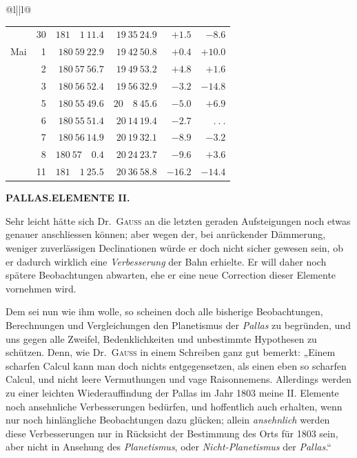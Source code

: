 \begin{center}
{\begin{tabular}{@{}l||l@{}}
\begin{tabular}[t]{@{}r@{\enspace}r|r|r|r|r@{}}
&30&$181\quad1\ 11.4$&$19\ 35\ 24.9$&$+1.5$&$-8.6$\\
Mai&1&$180\ 59\ 22.9$&$19\ 42\ 50.8$&$+0.4$&$+10.0$\\
&2&$180\ 57\ 56.7$&$19\ 49\ 53.2$&$+4.8$&$+1.6$\\
&3&$180\ 56\ 52.4$&$19\ 56\ 32.9$&$-3.2$&$-14.8$\\
&5&$180\ 55\ 49.6$&$20\quad8\ 45.6$&$-5.0$&$+6.9$\\
&6&$180\ 55\ 51.4$&$20\ 14\ 19.4$&$-2.7$&$\ .\ .\ .$\\
&7&$180\ 56\ 14.9$&$20\ 19\ 32.1$&$-8.9$&$-3.2$\\
&8&$180\ 57\quad0.4$&$20\ 24\ 23.7$&$-9.6$&$+3.6$\\
&11&$181\quad1\ 25.5$&$20\ 36\ 58.8$&$-16.2$&$-14.4$
\end{tabular}
\end{tabular}%
}%
\ifdim\wd0>\linewidth\resizebox{\linewidth}{!}{\usebox{0}}\else\usebox{0}\fi
\endgroup\end{center}
\clearpage
\thispagestyle{empty}
\noindent{}%
\makebox[12mm][l]{}%
\parbox[t]{\dimexpr\linewidth-24mm\relax}{\centering\footnotesize\bfseries PALLAS.\quad ELEMENTE II.\par}%
\par\nobreak\medskip
\par\indent Sehr leicht hätte sich Dr.\ \textsc{Gauss} an die letzten geraden Aufsteigungen noch etwas genauer anschliessen können; aber wegen der, bei anrückender Dämmerung, weniger zuverlässigen Declinationen würde er doch nicht sicher gewesen sein, ob er dadurch wirklich eine \textit{Verbesserung} der Bahn erhielte. Er will daher noch spätere Beobachtungen abwarten, ehe er eine neue Correction dieser Elemente vornehmen wird.

Dem sei nun wie ihm wolle, so scheinen doch alle bisherige Beobachtungen, Berechnungen und Vergleichungen den Planetismus der \textit{Pallas} zu begründen, und uns gegen alle Zweifel, Bedenklichkeiten und unbestimmte Hypothesen zu schützen. Denn, wie Dr.\ \textsc{Gauss} in einem Schreiben ganz gut bemerkt: „Einem scharfen Calcul kann man doch nichts entgegensetzen, als einen eben so scharfen Calcul, und nicht leere Vermuthungen und vage Raisonnemens. Allerdings werden zu einer leichten Wiederauffindung der Pallas im Jahr 1803 meine II. Elemente noch ansehnliche Verbesserungen bedürfen, und hoffentlich auch erhalten, wenn nur noch hinlängliche Beobachtungen dazu glücken; allein \textit{ansehnlich} werden diese Verbesserungen nur in Rücksicht der Bestimmung des Orts für 1803 sein, aber nicht in Ansehung des \textit{Planetismus}, oder \textit{Nicht-Planetismus} der \textit{Pallas}.“

